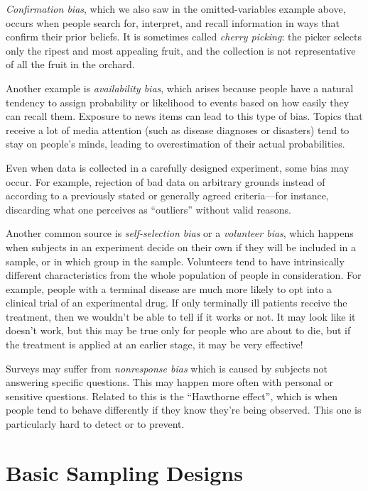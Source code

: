\emph{Confirmation bias}, which we also saw in the omitted-variables example
above, occurs when people search for, interpret, and recall information in ways
that confirm their prior beliefs. It is sometimes called \emph{cherry picking}:
the picker selects only the ripest and most appealing fruit, and the collection
is not representative of all the fruit in the orchard.

Another example is \emph{availability bias}, which arises because
people have a natural tendency to assign probability or likelihood
to events based on how easily they can recall them. Exposure to news
items can lead to this type of bias. Topics that receive a lot of media
attention (such as disease diagnoses or disasters)
tend to stay on people's minds, leading to overestimation
of their actual probabilities.

Even when data is collected in a carefully designed experiment, some bias may occur.
For example, rejection of bad data on arbitrary grounds instead of according to
a previously stated or generally agreed criteria---for instance, discarding
what one perceives as ``outliers'' without valid reasons.

Another common source is \emph{self-selection bias} or a \emph{volunteer bias},
which happens when subjects in an experiment decide on their own if they will be included in a
sample, or in which group in the sample. Volunteers tend to have intrinsically different characteristics from
the whole population of people in consideration. 
For example, people with a terminal disease are much more likely to opt into
a clinical trial of an experimental drug. If only terminally ill patients receive the
treatment, then we wouldn't be able to tell if it works or not. It may look like
it doesn't work, but this may be true only for people who are about to die, but
if the treatment is applied at an earlier stage, it may be very effective!
  
Surveys may suffer from \emph{nonresponse bias} which is caused by subjects 
not answering specific questions. This may happen more often with
personal or sensitive questions.
Related to this is the ``Hawthorne effect'', which is when people tend to behave
differently if they know they're being observed.
This one is particularly hard to detect or to prevent.

\section{Basic Sampling Designs}\label{sampling-designs}

